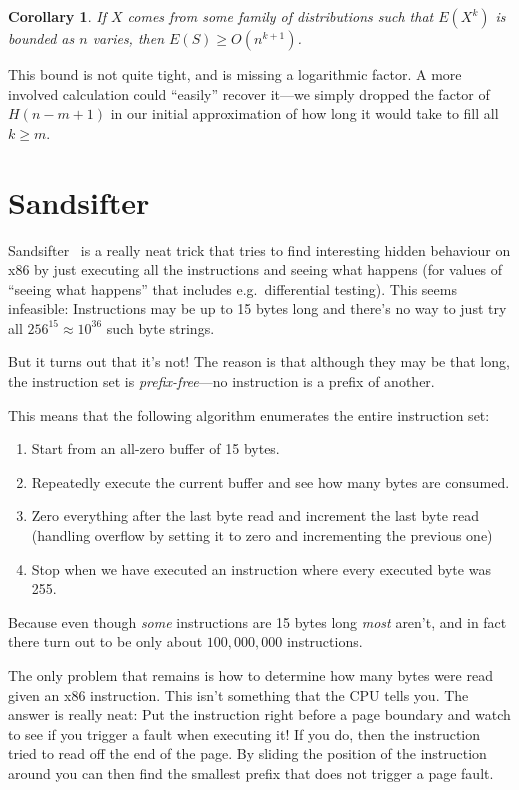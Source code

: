 \documentclass[a4paper]{article}
\newtheorem{corollary}{Corollary}
\begin{document}
\begin{corollary}
If \(X\) comes from some family of distributions such that \(E(X^k)\) is bounded as \(n\) varies,
then \(E(S) \geq O(n^{k + 1})\).
\end{corollary}

This bound is not quite tight,
and is missing a logarithmic factor.
A more involved calculation could ``easily'' recover it---we
simply dropped the factor of \(H(n - m + 1)\) in our initial approximation of how long it would take to fill all \(k \geq m\).

\section{Sandsifter}

Sandsifter~\cite{sandsifter} is a really neat trick that tries to find interesting hidden behaviour on x86 by just executing all the instructions and seeing what happens
(for values of ``seeing what happens'' that includes e.g.\ differential testing).
This seems infeasible:
Instructions may be up to 15 bytes long and there's no way to just try all \(256^{15} \approx 10^{36}\) such byte strings.

But it turns out that it's not!
The reason is that although they may be that long,
the instruction set is \emph{prefix-free}---no
instruction is a prefix of another.

This means that the following algorithm enumerates the entire instruction set:

\begin{enumerate}
\item Start from an all-zero buffer of 15 bytes.
\item Repeatedly execute the current buffer and see how many bytes are consumed.
\item Zero everything after the last byte read and increment the last byte read (handling overflow by setting it to zero and incrementing the previous one)
\item Stop when we have executed an instruction where every executed byte was 255.
\end{enumerate}

Because even though \emph{some} instructions are 15 bytes long \emph{most} aren't,
and in fact there turn out to be only about \(100,000,000\) instructions.

The only problem that remains is how to determine how many bytes were read given an x86 instruction.
This isn't something that the CPU tells you.
The answer is really neat:
Put the instruction right before a page boundary and watch to see if you trigger a fault when executing it!
If you do, then the instruction tried to read off the end of the page.
By sliding the position of the instruction around you can then find the smallest prefix that does not trigger a page fault.
\end{document}
